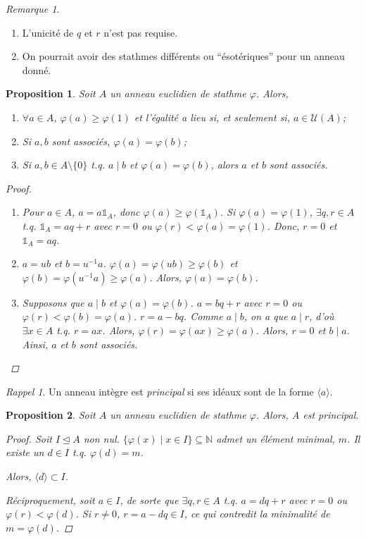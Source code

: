 \documentclass{report}
\newtheorem*{prop}{Proposition}
\theoremstyle{definition}
\theoremstyle{remark}
\newtheorem*{rmq}{Remarque}
\newtheorem*{rapp}{Rappel}
\def\gte{\geqslant}
\def\NN{\mathbb{N}}
\def\id{\mathds{1}}
\begin{document}
	\begin{rmq}
		\begin{enumerate}
			\item L'unicit\'e de $q$ et $r$ n'est pas requise.
			\item On pourrait avoir des stathmes diff\'erents ou ``\'esot\'eriques'' pour un anneau donn\'e.
		\end{enumerate}
	\end{rmq}

	\begin{prop}
		Soit $A$ un anneau euclidien de stathme $\varphi$. Alors,
		\begin{enumerate}
			\item $\forall a\in A$, $\varphi(a)\gte\varphi(1)$ et l'\'egalit\'e a lieu si, et seulement si, $a\in\mathcal{U}(A)$;
			\item Si $a,b$ sont associ\'es, $\varphi(a)=\varphi(b)$;
			\item Si $a,b\in A\setminus\{0\}$ t.q. $a \mid b$ et $\varphi(a)=\varphi(b)$, alors $a$ et $b$ sont associ\'es.
		\end{enumerate}
		\begin{proof}
			\begin{enumerate}
				\item Pour $a\in A$, $a=a\id_A$, donc $\varphi(a)\gte\varphi(\id_A)$. Si $\varphi(a)=\varphi(1)$, $\exists q,r\in A$ t.q. $\id_A=aq+r$ avec $r=0$ ou $\varphi(r)<\varphi(a)=\varphi(1)$. Donc, $r=0$ et $\id_A=aq$.
				\item $a=ub$ et $b=u^{-1}a$. $\varphi(a)=\varphi(ub)\gte\varphi(b)$ et $\varphi(b)=\varphi(u^{-1}a)\gte\varphi(a)$. Alors, $\varphi(a)=\varphi(b)$.
				\item Supposons que $a \mid b$ et $\varphi(a)=\varphi(b)$. $a=bq+r$ avec $r=0$ ou $\varphi(r)<\varphi(b)=\varphi(a)$. $r=a-bq$. Comme $a \mid b$, on a que $a \mid r$, d'o\`u $\exists x\in A$ t.q. $r=ax$. Alors, $\varphi(r)=\varphi(ax)\gte\varphi(a)$. Alors, $r=0$ et $b \mid a$. Ainsi, $a$ et $b$ sont associ\'es.
			\end{enumerate}
		\end{proof}
	\end{prop}

	\begin{rapp}
		Un anneau int\`egre est \emph{principal} si ses id\'eaux sont de la forme $\langle a \rangle$.
	\end{rapp}

	\begin{prop}
		Soit $A$ un anneau euclidien de stathme $\varphi$. Alors, $A$ est principal.
		\begin{proof}
			Soit $I\trianglelefteq A$ non nul. $\{\varphi(x) \mid x\in I\} \subseteq \NN$ admet un \'el\'ement minimal, $m$. Il existe un $d\in I$ t.q. $\varphi(d)=m$.

			Alors, $\langle d \rangle \subset I$.

			R\'eciproquement, soit $a\in I$, de sorte que $\exists q,r\in A$ t.q. $a=dq+r$ avec $r=0$ ou $\varphi(r)<\varphi(d)$. Si $r\neq0$, $r=a-dq\in I$, ce qui contredit la minimalit\'e de $m=\varphi(d)$.
		\end{proof}
	\end{prop}
\end{document}
